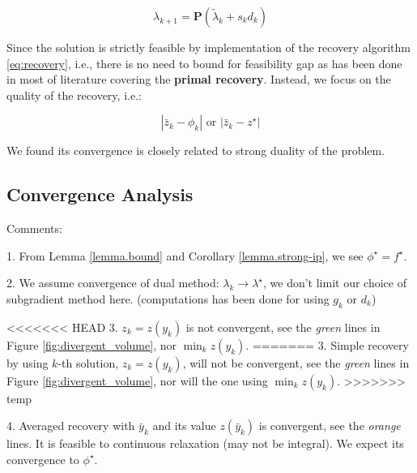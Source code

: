 \documentclass[../main]{subfiles}
\begin{document}
\[\lambda_{k+1} = \mathbf{P}(\tilde\lambda_{k} + s_{k}d_{k})\]

Since the solution is strictly feasible by implementation of the
recovery algorithm \eqref{eq:recovery}, i.e., there is no need to bound for feasibility gap
as has been done in most of literature covering the \textbf{primal
  recovery}. Instead, we focus on the quality of the recovery, i.e.:

\[
  |\bar z_k - \phi_k| \textrm { or } |\bar z_k - z^\star|
\]

We found its convergence is closely related to strong duality of the problem.

\subsection{Convergence Analysis}\label{dual.analysis}

Comments:

1. From Lemma \ref{lemma.bound} and Corollary \ref{lemma.strong-ip}, we see \(\phi^\star = f^\star\).

2. We assume convergence of dual method: \(\lambda_k \to \lambda^\star\), we don't limit our choice of subgradient method here. (computations has been done for using \(g_k\) or \(d_k\))

<<<<<<< HEAD
3. \(z_k = z(y_k)\) is not convergent, see the \emph{green} lines in Figure \ref{fig:divergent_volume}, nor \(\min_k z(y_k)\).
=======
3. Simple recovery by using \(k\)-th solution, \(z_k = z(y_k)\), will not be convergent, see the \emph{green} lines in Figure \ref{fig:divergent_volume}, nor will the one using \(\min_k z(y_k)\).
>>>>>>> temp

4. Averaged recovery with \(\bar y_k\) and its value \(z(\bar y_k)\) is convergent, see the \emph{orange} lines. It is feasible to continuous relaxation (may not be integral). We expect its convergence to \(\phi^\star\).

\end{document}
